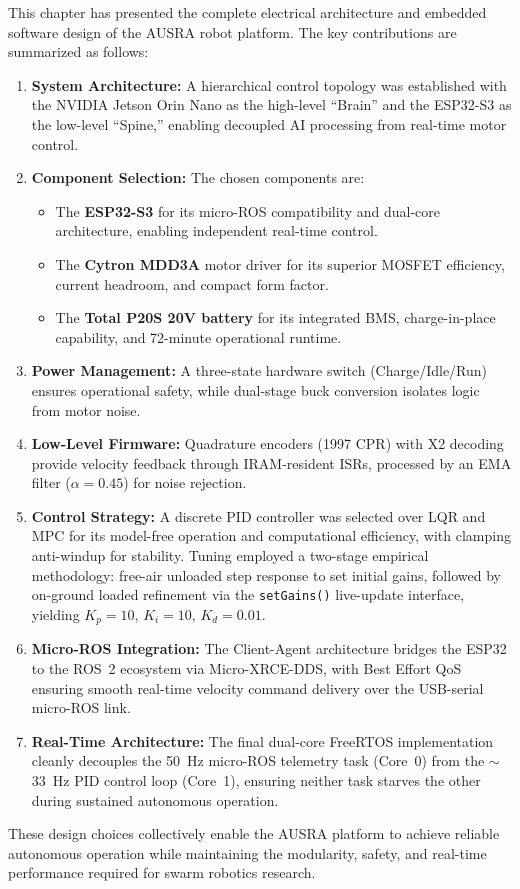 This chapter has presented the complete electrical architecture and embedded software design of the AUSRA robot platform. The key contributions are summarized as follows:

\begin{enumerate}
    \item \textbf{System Architecture:} A hierarchical control topology was established with the NVIDIA Jetson Orin Nano as the high-level ``Brain'' and the ESP32-S3 as the low-level ``Spine,'' enabling decoupled AI processing from real-time motor control.
    
    \item \textbf{Component Selection:} The chosen components are:
    \begin{itemize}
        \item The \textbf{ESP32-S3} for its micro-ROS compatibility and dual-core architecture, enabling independent real-time control.
        \item The \textbf{Cytron MDD3A} motor driver for its superior MOSFET efficiency, current headroom, and compact form factor.
        \item The \textbf{Total P20S 20V battery} for its integrated BMS, charge-in-place capability, and 72-minute operational runtime.
    \end{itemize}
    
    \item \textbf{Power Management:} A three-state hardware switch (Charge/Idle/Run) ensures operational safety, while dual-stage buck conversion isolates logic from motor noise.
    
    \item \textbf{Low-Level Firmware:} Quadrature encoders (1997 CPR) with X2 decoding provide velocity feedback through IRAM-resident ISRs, processed by an EMA filter ($\alpha = 0.45$) for noise rejection.
    
    \item \textbf{Control Strategy:} A discrete PID controller was selected over LQR and MPC for its model-free operation and computational efficiency, with clamping anti-windup for stability. Tuning employed a two-stage empirical methodology: free-air unloaded step response to set initial gains, followed by on-ground loaded refinement via the \texttt{setGains()} live-update interface, yielding $K_p=10$, $K_i=10$, $K_d=0.01$.
    
    \item \textbf{Micro-ROS Integration:} The Client-Agent architecture bridges the ESP32 to the ROS~2 ecosystem via Micro-XRCE-DDS, with Best Effort QoS ensuring smooth real-time velocity command delivery over the USB-serial micro-ROS link.
    
    \item \textbf{Real-Time Architecture:} The final dual-core FreeRTOS implementation cleanly decouples the 50~Hz micro-ROS telemetry task (Core~0) from the $\sim$33~Hz PID control loop (Core~1), ensuring neither task starves the other during sustained autonomous operation.
\end{enumerate}

These design choices collectively enable the AUSRA platform to achieve reliable autonomous operation while maintaining the modularity, safety, and real-time performance required for swarm robotics research.

